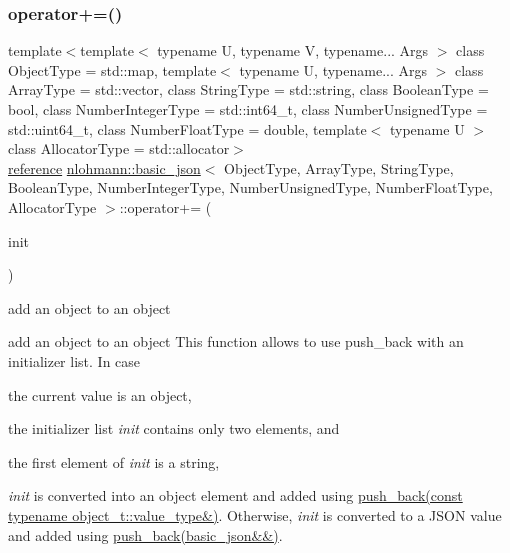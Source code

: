\subsubsection{\texorpdfstring{operator+=()}{operator+=()}\hspace{0.1cm}{\footnotesize\ttfamily [4/4]}}
{\footnotesize\ttfamily template$<$template$<$ typename U, typename V, typename... Args $>$ class Object\+Type = std\+::map, template$<$ typename U, typename... Args $>$ class Array\+Type = std\+::vector, class String\+Type  = std\+::string, class Boolean\+Type  = bool, class Number\+Integer\+Type  = std\+::int64\+\_\+t, class Number\+Unsigned\+Type  = std\+::uint64\+\_\+t, class Number\+Float\+Type  = double, template$<$ typename U $>$ class Allocator\+Type = std\+::allocator$>$ \\
\hyperlink{classnlohmann_1_1basic__json_a3ec8e17be8732fe436e9d6733f52b7a3}{reference} \hyperlink{classnlohmann_1_1basic__json}{nlohmann\+::basic\+\_\+json}$<$ Object\+Type, Array\+Type, String\+Type, Boolean\+Type, Number\+Integer\+Type, Number\+Unsigned\+Type, Number\+Float\+Type, Allocator\+Type $>$\+::operator+= (\begin{DoxyParamCaption}\item[{std\+::initializer\+\_\+list$<$ \hyperlink{classnlohmann_1_1basic__json}{basic\+\_\+json}$<$ Object\+Type, Array\+Type, String\+Type, Boolean\+Type, Number\+Integer\+Type, Number\+Unsigned\+Type, Number\+Float\+Type, Allocator\+Type $>$ $>$}]{init }\end{DoxyParamCaption})\hspace{0.3cm}{\ttfamily [inline]}}



add an object to an object 

add an object to an object This function allows to use {\ttfamily push\+\_\+back} with an initializer list. In case


\begin{DoxyEnumerate}
\item the current value is an object,
\item the initializer list {\itshape init} contains only two elements, and
\item the first element of {\itshape init} is a string,
\end{DoxyEnumerate}

{\itshape init} is converted into an object element and added using \hyperlink{classnlohmann_1_1basic__json_a5212588544f6d2266384c3be9bfda0c5}{push\+\_\+back(const typename object\+\_\+t\+::value\+\_\+type\&)}. Otherwise, {\itshape init} is converted to a J\+S\+ON value and added using \hyperlink{classnlohmann_1_1basic__json_a486b96adbf4886c38e38c952394a220f}{push\+\_\+back(basic\+\_\+json\&\&)}.


